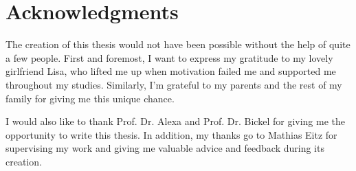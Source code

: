 




\begingroup
\let\clearpage\relax
\let\cleardoublepage\relax
\let\cleardoublepage\relax
\chapter*{Acknowledgments}

The creation of this thesis would not have been possible without the help of
quite a few people. First and foremost, I want to express my gratitude to my
lovely girlfriend Lisa, who lifted me up when motivation failed me and
supported me throughout my studies. Similarly, I'm grateful to my parents and
the rest of my family for giving me this unique chance.

I would also like to thank Prof. Dr. Alexa and Prof. Dr. Bickel for giving me
the opportunity to write this thesis. In addition, my thanks go to Mathias Eitz
for supervising my work and giving me valuable advice and feedback during its
creation.

\endgroup



